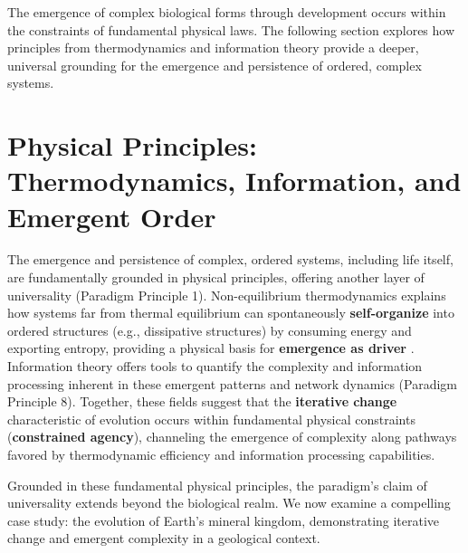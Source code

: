 \documentclass[12pt,openany]{book}
\begin{document}
The emergence of complex biological forms through development occurs within the constraints of fundamental physical laws. The following section explores how principles from thermodynamics and information theory provide a deeper, universal grounding for the emergence and persistence of ordered, complex systems.

\section{Physical Principles: Thermodynamics, Information, and Emergent Order} \label{sec:thermoinfo}
The emergence and persistence of complex, ordered systems, including life itself, are fundamentally grounded in physical principles, offering another layer of universality (Paradigm Principle 1). Non-equilibrium thermodynamics explains how systems far from thermal equilibrium can spontaneously \textbf{self-organize} into ordered structures (e.g., dissipative structures) by consuming energy and exporting entropy, providing a physical basis for \textbf{emergence as driver} \citep{peng2021nonequilibrium,koonin2022thermo}. Information theory offers tools to quantify the complexity and information processing inherent in these emergent patterns and network dynamics (Paradigm Principle 8). Together, these fields suggest that the \textbf{iterative change} characteristic of evolution occurs within fundamental physical constraints (\textbf{constrained agency}), channeling the emergence of complexity along pathways favored by thermodynamic efficiency and information processing capabilities.

Grounded in these fundamental physical principles, the paradigm's claim of universality extends beyond the biological realm. We now examine a compelling case study: the evolution of Earth's mineral kingdom, demonstrating iterative change and emergent complexity in a geological context.

\end{document}
